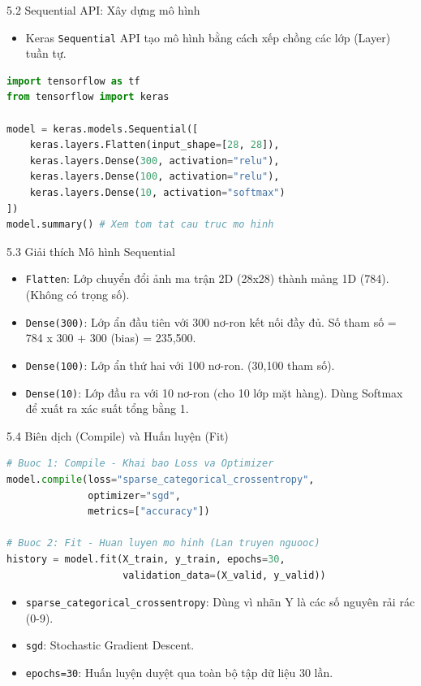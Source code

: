 \documentclass[aspectratio=169, 12pt]{beamer}
\begin{document}
\begin{frame}[fragile]{5.2 Sequential API: Xây dựng mô hình}
    \begin{itemize}
        \item Keras \texttt{Sequential} API tạo mô hình bằng cách xếp chồng các lớp (Layer) tuần tự.
    \end{itemize}
\begin{lstlisting}[language=Python]
import tensorflow as tf
from tensorflow import keras

model = keras.models.Sequential([
    keras.layers.Flatten(input_shape=[28, 28]),
    keras.layers.Dense(300, activation="relu"),
    keras.layers.Dense(100, activation="relu"),
    keras.layers.Dense(10, activation="softmax")
])
model.summary() # Xem tom tat cau truc mo hinh
\end{lstlisting}
\end{frame}

\begin{frame}{5.3 Giải thích Mô hình Sequential}
    \begin{itemize}
        \item \texttt{Flatten}: Lớp chuyển đổi ảnh ma trận 2D (28x28) thành mảng 1D (784). (Không có trọng số).
        \item \texttt{Dense(300)}: Lớp ẩn đầu tiên với 300 nơ-ron kết nối đầy đủ. Số tham số = 784 x 300 + 300 (bias) = 235,500.
        \item \texttt{Dense(100)}: Lớp ẩn thứ hai với 100 nơ-ron. (30,100 tham số).
        \item \texttt{Dense(10)}: Lớp đầu ra với 10 nơ-ron (cho 10 lớp mặt hàng). Dùng Softmax để xuất ra xác suất tổng bằng 1.
    \end{itemize}
\end{frame}

\begin{frame}[fragile]{5.4 Biên dịch (Compile) và Huấn luyện (Fit)}
\begin{lstlisting}[language=Python]
# Buoc 1: Compile - Khai bao Loss va Optimizer
model.compile(loss="sparse_categorical_crossentropy",
              optimizer="sgd",
              metrics=["accuracy"])

# Buoc 2: Fit - Huan luyen mo hinh (Lan truyen nguooc)
history = model.fit(X_train, y_train, epochs=30,
                    validation_data=(X_valid, y_valid))
\end{lstlisting}
    \begin{itemize}
        \item \texttt{sparse\_categorical\_crossentropy}: Dùng vì nhãn Y là các số nguyên rải rác (0-9).
        \item \texttt{sgd}: Stochastic Gradient Descent.
        \item \texttt{epochs=30}: Huấn luyện duyệt qua toàn bộ tập dữ liệu 30 lần.
    \end{itemize}
\end{frame}
\end{document}
